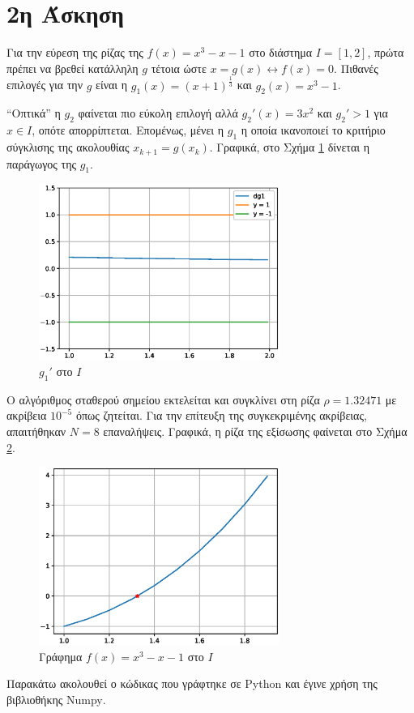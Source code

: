 \documentclass[assignment2.tex]{subfiles}
\begin{document}
\section*{2η Άσκηση}
Για την εύρεση της ρίζας της $f(x)=x^3-x-1$ στο διάστημα $I=[1,2]$, πρώτα πρέπει να βρεθεί κατάλληλη $g$ τέτοια ώστε $x=g(x) \leftrightarrow f(x)=0$. Πιθανές επιλογές για την $g$ είναι η $g_1(x)=\left(x+1\right)^{\frac{1}{3}}$ και $g_2(x)=x^3-1$. 

``Οπτικά'' η $g_2$ φαίνεται πιο εύκολη επιλογή αλλά $g_2'(x) = 3x^2$ και $g_2'>1$ για $x\in I$, οπότε απορρίπτεται. Επομένως, μένει η $g_1$ η οποία ικανοποιεί το κριτήριο σύγκλισης της ακολουθίας $x_{k+1}=g(x_k)$. Γραφικά, στο Σχήμα \ref{fig:dg2} δίνεται η παράγωγος της $g_1$.
\begin{figure}[hp]
	\includegraphics[width=0.7\textwidth]{dg2.eps}
	\centering
	\caption{$g_1'$ στο $I$}
	\label{fig:dg2}
\end{figure} 

Ο αλγόριθμος σταθερού σημείου εκτελείται και συγκλίνει στη ρίζα $\rho=1.32471$ με ακρίβεια $10^{-5}$ όπως ζητείται. Για την επίτευξη της συγκεκριμένης ακρίβειας, απαιτήθηκαν $N=8$ επαναλήψεις. Γραφικά, η ρίζα της εξίσωσης φαίνεται στο Σχήμα \ref{fig:f2}.
\begin{figure}[hp]
	\includegraphics[width=0.7\textwidth]{f2.eps}
	\centering
	\caption{Γράφημα $f(x)=x^3-x-1$ στο $I$}
	\label{fig:f2}
\end{figure}

Παρακάτω ακολουθεί ο κώδικας που γράφτηκε σε \textlatin{Python} και έγινε χρήση της βιβλιοθήκης \textlatin{Numpy}.

\end{document}
